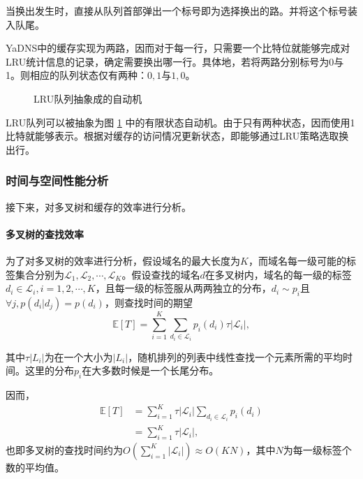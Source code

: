 当换出发生时，直接从队列首部弹出一个标号即为选择换出的路。并将这个标号装入队尾。

YaDNS中的缓存实现为两路，因而对于每一行，只需要一个比特位就能够完成对LRU统计信息的记录，确定需要换出哪一行。具体地，若将两路分别标号为0与1。则相应的队列状态仅有两种：$0, 1$与$1, 0$。

\begin{figure}[h]
  \centering
  \caption{LRU队列抽象成的自动机}
  \label{fig:lru-automata}
\end{figure}

LRU队列可以被抽象为图 \ref{fig:lru-automata} 中的有限状态自动机。由于只有两种状态，因而使用1比特就能够表示。根据对缓存的访问情况更新状态，即能够通过LRU策略选取换出行。

\subsubsection{时间与空间性能分析}
\label{sec:time-space-complexity}

接下来，对多叉树和缓存的效率进行分析。

\paragraph{多叉树的查找效率}

为了对多叉树的效率进行分析，假设域名的最大长度为$K$，而域名每一级可能的标签集合分别为$\mathcal L_1, \mathcal L_2, \cdots, \mathcal L_K$。假设查找的域名$d$在多叉树内，域名的每一级的标签$d_i \in \mathcal L_i, i = 1, 2, \cdots, K$，且每一级的标签服从两两独立的分布，$d_i \sim p_i$且$\forall j, p(d_i | d_j) = p(d_i)$，则查找时间的期望
\begin{equation}
  \mathds E [T] = \sum_{i = 1}^K \sum_{d_i \in \mathcal L_i} p_i(d_i) \tau |\mathcal L_i|,
\end{equation}

其中$\tau | L_i |$为在一个大小为$| L_i |$，随机排列的列表中线性查找一个元素所需的平均时间。这里的分布$p_i$在大多数时候是一个长尾分布。

因而，
\begin{equation}
\begin{split}
  \mathds E[T] &= \sum_{i=1}^K \tau | \mathcal L_i | \sum_{d_i \in \mathcal L_i} p_i(d_i) \\
  &= \sum_{i=1}^K \tau | \mathcal L_i |,
\end{split}
\end{equation}
也即多叉树的查找时间约为$O(\sum_{i=1}^K | \mathcal L_i |) \approx O(KN)$，其中$N$为每一级标签个数的平均值。

